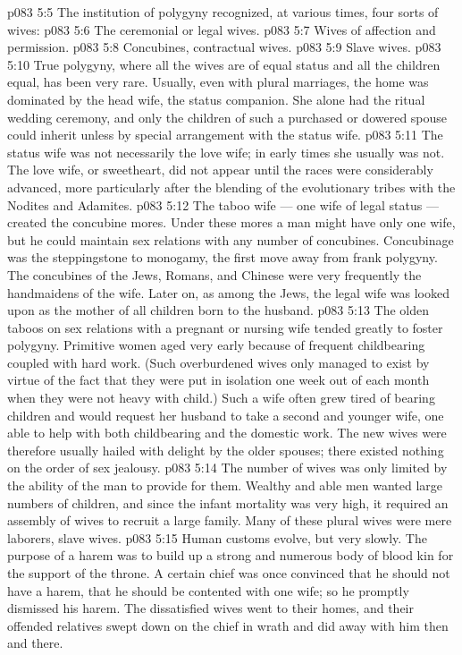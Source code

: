 \vs p083 5:5 The institution of polygyny recognized, at various times, four sorts of wives:
\vs p083 5:6 \bibnobreakspace The ceremonial or legal wives.
\vs p083 5:7 \bibnobreakspace Wives of affection and permission.
\vs p083 5:8 \bibnobreakspace Concubines, contractual wives.
\vs p083 5:9 \bibnobreakspace Slave wives.
\vs p083 5:10 \pc True polygyny, where all the wives are of equal status and all the children equal, has been very rare. Usually, even with plural marriages, the home was dominated by the head wife, the status companion. She alone had the ritual wedding ceremony, and only the children of such a purchased or dowered spouse could inherit unless by special arrangement with the status wife.
\vs p083 5:11 The status wife was not necessarily the love wife; in early times she usually was not. The love wife, or sweetheart, did not appear until the races were considerably advanced, more particularly after the blending of the evolutionary tribes with the Nodites and Adamites.
\vs p083 5:12 The taboo wife --- one wife of legal status --- created the concubine mores. Under these mores a man might have only one wife, but he could maintain sex relations with any number of concubines. Concubinage was the steppingstone to monogamy, the first move away from frank polygyny. The concubines of the Jews, Romans, and Chinese were very frequently the handmaidens of the wife. Later on, as among the Jews, the legal wife was looked upon as the mother of all children born to the husband.
\vs p083 5:13 The olden taboos on sex relations with a pregnant or nursing wife tended greatly to foster polygyny. Primitive women aged very early because of frequent childbearing coupled with hard work. (Such overburdened wives only managed to exist by virtue of the fact that they were put in isolation one week out of each month when they were not heavy with child.) Such a wife often grew tired of bearing children and would request her husband to take a second and younger wife, one able to help with both childbearing and the domestic work. The new wives were therefore usually hailed with delight by the older spouses; there existed nothing on the order of sex jealousy.
\vs p083 5:14 The number of wives was only limited by the ability of the man to provide for them. Wealthy and able men wanted large numbers of children, and since the infant mortality was very high, it required an assembly of wives to recruit a large family. Many of these plural wives were mere laborers, slave wives.
\vs p083 5:15 Human customs evolve, but very slowly. The purpose of a harem was to build up a strong and numerous body of blood kin for the support of the throne. A certain chief was once convinced that he should not have a harem, that he should be contented with one wife; so he promptly dismissed his harem. The dissatisfied wives went to their homes, and their offended relatives swept down on the chief in wrath and did away with him then and there.

